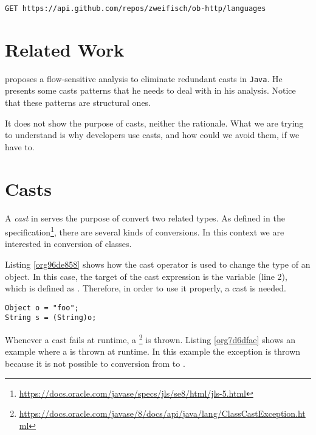 \documentclass{usiinfdocprop}
\begin{document}
\lstset{language=http,label= ,caption= ,captionpos=b,numbers=none}
\begin{lstlisting}
GET https://api.github.com/repos/zweifisch/ob-http/languages
\end{lstlisting}

\section{Related Work}
\label{sec:org255eb70}
\cite{winther_guarded_2011} proposes a flow-sensitive analysis to eliminate
redundant casts in \texttt{Java}.
He presents some casts patterns that he needs to deal with in his analysis.
Notice that these patterns are structural ones.

\cite{staicu_understanding_2017}

\cite{buse_synthesizing_2012}

It does not show the purpose of casts, neither the rationale.
What we are trying to understand is why developers use casts,
and how could we avoid them, if we have to.

\section{Casts \label{org9cc9cb6}}
\label{sec:org6ed331e}
A \emph{cast} in \java{} serves the purpose of convert two related types. 
As defined in the \java{} specification\footnote{\url{https://docs.oracle.com/javase/specs/jls/se8/html/jls-5.html}}, there are several kinds of conversions. 
In this context we are interested in conversion of classes. 

Listing \ref{org96de858} shows how the cast operator is used to change the type of an object. 
In this case, the target of the cast expression is the variable  (line 2), which is defined as . 
Therefore, in order to use it properly, a cast is needed. 

\begin{lstlisting}
Object o = "foo"; 
String s = (String)o; 
\end{lstlisting}

Whenever a cast fails at runtime, a \cce{} \footnote{\url{https://docs.oracle.com/javase/8/docs/api/java/lang/ClassCastException.html}} is thrown. 
Listing \ref{org7d6dfae} shows an example where a \cce{} is thrown at runtime. 
In this example the exception is thrown because it is not possible to conversion from  to . 
\end{document}
